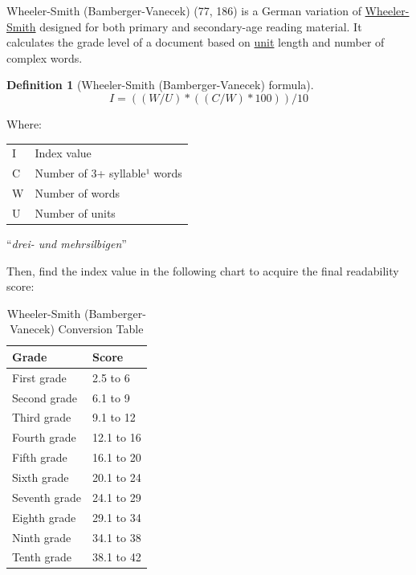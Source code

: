 \documentclass[
]{book}
\theoremstyle{definition}
\newtheorem{definition}{Definition}[chapter]
\theoremstyle{definition}
\theoremstyle{definition}
\theoremstyle{definition}
\theoremstyle{remark}
\begin{document}
Wheeler-Smith (Bamberger-Vanecek) (77, 186) is a German variation of \protect\hyperlink{wheeler-smith}{Wheeler-Smith} designed for both primary and secondary-age reading material. It calculates the grade level of a document based on \protect\hyperlink{glossary}{unit} length and number of complex words.

\begin{definition}[Wheeler-Smith (Bamberger-Vanecek) formula]
\protect\hypertarget{def:wheelersmithde}{}{\label{def:wheelersmithde} {} }\[
I = ((W/U)*((C/W)*100)) / 10
\]
\end{definition}

Where:

\begin{table}
\centering
\begin{threeparttable}
\begin{tabular}[t]{ll}
\toprule
I & Index value\\
C & Number of 3+ syllable¹ words\\
W & Number of words\\
U & Number of units\\
\bottomrule
\end{tabular}
\begin{tablenotes}
\item[1] “\textit{drei- und mehrsilbigen}”
\end{tablenotes}
\end{threeparttable}
\end{table}

Then, find the index value in the following chart to acquire the final readability score:

\begin{table}

\caption{\label{tab:unnamed-chunk-54}Wheeler-Smith (Bamberger-Vanecek) Conversion Table}
\centering
\begin{tabular}[t]{ll}
\toprule
Grade & Score\\
\midrule
First grade & 2.5 to 6\\
Second grade & 6.1 to 9\\
Third grade & 9.1 to 12\\
Fourth grade & 12.1 to 16\\
Fifth grade & 16.1 to 20\\
Sixth grade & 20.1 to 24\\
Seventh grade & 24.1 to 29\\
Eighth grade & 29.1 to 34\\
Ninth grade & 34.1 to 38\\
Tenth grade & 38.1 to 42\\
\bottomrule
\end{tabular}
\end{table}
\end{document}
